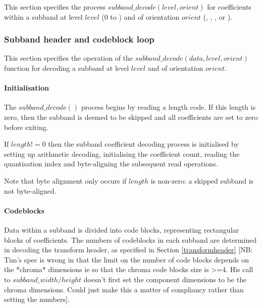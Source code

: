 \label{subbanddecodeprocess}

This section specifies the process $subband\_decode(level,orient)$ for coefficients
within a subband at level $level$ ($0$ to \TransformDepth) and of orientation $orient$
(\LL, \LH, \HL, or \HH). 

\subsubsection{Subband header and codeblock loop}

This section specifies the operation of the $subband\_decode(data, level, orient)$
function for decoding a subband at level $level$ and of orientation $orient$.

\paragraph{Initialisation\newline}

The $subband\_decode()$ process begins by reading a length code. If this length is
zero, then the subband is deemed to be skipped and all coefficients are set to zero
before exiting.


\begin{pseudo*}
    \bsEND
  \bsEND
  \bsRET{}
\bsEND
\end{pseudo*}

If $length!=0$ then the subband coefficient decoding process is initialised by
setting up arithmetic decoding, initialising the coefficient count, reading
the quantisation index and byte-aligning the subsequent read operations.

\begin{pseudo*}
\end{pseudo*}

Note that byte alignment only occurs if $length$ is non-zero: a skipped 
subband is not byte-aligned.

\paragraph{Codeblocks\newline}

Data within a subband is divided into code blocks,
representing rectangular blocks of coefficients. The numbers of codeblocks
in each subband are determined in decoding the transform header, as specified
in Section \ref{transformheader} [NB: Tim's spec is wrong in that the limit on
the number of code blocks depends on the *chroma* dimensions ie so that the
chroma code blocks size is >=4. His call to $subband\_width/height$ doesn't first 
set the component dimensions to be the chroma dimensions. Could just make this a 
matter of compliancy rather than setting the numbers].

